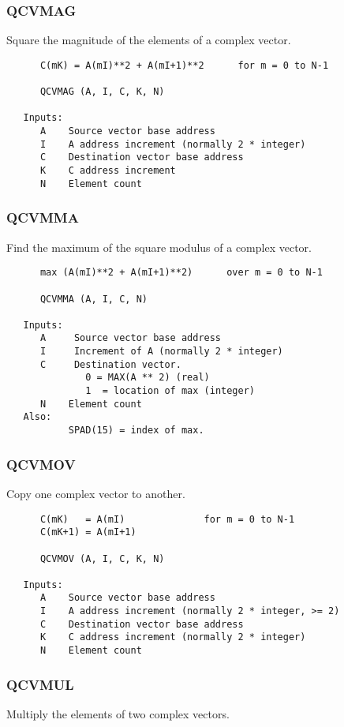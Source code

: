 \subsubsection{QCVMAG }
Square the magnitude of the elements of a complex vector.

\begin{verbatim}
      C(mK) = A(mI)**2 + A(mI+1)**2      for m = 0 to N-1

      QCVMAG (A, I, C, K, N)

   Inputs:
      A    Source vector base address
      I    A address increment (normally 2 * integer)
      C    Destination vector base address
      K    C address increment
      N    Element count

\end{verbatim}
\subsubsection{QCVMMA }
Find the maximum of the square modulus of a complex vector.

\begin{verbatim}
      max (A(mI)**2 + A(mI+1)**2)      over m = 0 to N-1

      QCVMMA (A, I, C, N)

   Inputs:
      A     Source vector base address
      I     Increment of A (normally 2 * integer)
      C     Destination vector.
              0 = MAX(A ** 2) (real)
              1  = location of max (integer)
      N    Element count
   Also:
           SPAD(15) = index of max.

\end{verbatim}
\subsubsection{QCVMOV }
Copy one complex vector to another.

\begin{verbatim}
      C(mK)   = A(mI)              for m = 0 to N-1
      C(mK+1) = A(mI+1)

      QCVMOV (A, I, C, K, N)

   Inputs:
      A    Source vector base address
      I    A address increment (normally 2 * integer, >= 2)
      C    Destination vector base address
      K    C address increment (normally 2 * integer)
      N    Element count

\end{verbatim}
\subsubsection{QCVMUL }
Multiply the elements of two complex vectors.

